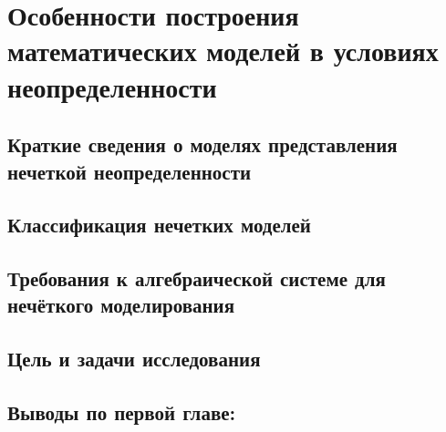 \chapter{Особенности построения математических моделей в условиях неопределенности}
\label{chapter1}

\section{Краткие сведения о моделях представления нечеткой неопределенности}
\label{chapter1_1}


\section{Классификация нечетких моделей} 
\label{chapter1_2}


\section{Требования к алгебраической системе для нечёткого моделирования} 
\label{chapter1_3}


\section{Цель и задачи исследования} 
\label{chapter1_4}


\newpage
\section*{Выводы по первой главе:}
\label{chapter1_5}

